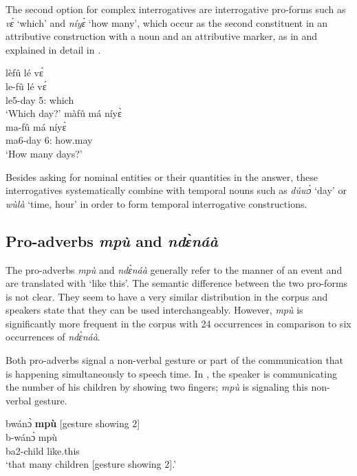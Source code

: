 The second option for complex interrogatives are interrogative pro-forms such as {\itshape vɛ́} `which' and {\itshape níyɛ̀} `how many', which occur as the second constituent in an attributive construction with a noun and an attributive marker, as in  and explained in detail in .


\ea \label{intercomp1}
  \ea \label{intercomp1a}
 \glll    lèfû lé vɛ́   \\
            le-fû lé vɛ́   \\
             le5-day 5:{\ATT} which \\
   \trans `Which day?'
\ex\label{intercomp1b}
 \glll    màfû má níyɛ̀  \\
            ma-fû má níyɛ̀  \\
             ma6-day 6:{\ATT} how.may  \\
   \trans `How many days?'
\z
\z


\noindent Besides asking for nominal entities or their quantities in the answer, these interrogatives systematically combine with temporal nouns such as {\itshape dúwɔ̀} `day' or {\itshape wùlà} `time, hour' in order to form temporal interrogative constructions.










\subsection{Pro-adverbs {\itshape mpù} and {\itshape ndɛ̀náà }}
\label{sec:ProADV}

The pro-adverbs {\itshape mpù} and {\itshape ndɛ̀náà} generally refer to the manner of an event and are translated with `like this'. The semantic difference between the two pro-forms is not clear. They seem to have a very similar distribution in the corpus and speakers state that they can be used interchangeably. However, {\itshape mpù} is significantly more frequent in the corpus with 24 occurrences in comparison to six occurrences of {\itshape ndɛ̀náà}.

Both pro-adverbs signal a non-verbal gesture or part of the communication that is happening simultaneously to speech time. In , the speaker is communicating the number of his children by showing two fingers; {\itshape mpù} is signaling this non-verbal gesture.

\ea \label{likethis1}
  \glll  bwánɔ̀ {\bfseries mpù} [gesture showing 2]\\
          b-wánɔ̀ mpù \\
         ba2-child like.this   \\
    \trans `that many children [gesture showing 2].'
\z

